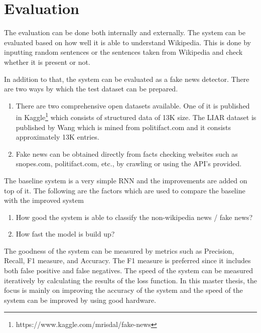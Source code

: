 \documentclass[a4paper, 11pt]{article}
\begin{document}
\section{Evaluation}

The evaluation can be done both internally and externally. The system can be evaluated based on how well it is able to understand Wikipedia. This is done by inputting random sentences or the sentences taken from Wikipedia and check whether it is present or not. 

In addition to that, the system can be evaluated as a fake news detector. There are two ways by which the test dataset can be prepared. 

\begin{enumerate}
\item There are two comprehensive open datasets available. One of it is published in Kaggle\footnote{https://www.kaggle.com/mrisdal/fake-news} which consists of structured data of 13K size. The LIAR dataset is published by Wang \cite{Wang2017} which is mined from politifact.com and it consists approximately 13K entries.
\item Fake news can be obtained directly from facts checking websites such as snopes.com, politifact.com, etc., by crawling or using the API's provided.
\end{enumerate}

The baseline system is a very simple RNN and the improvements are added on top of it. The following are the factors which are used to compare the baseline with the improved system
\begin{enumerate}
\item How good the system is able to classify the non-wikipedia news / fake news?
\item How fast the model is build up?
\end{enumerate}

The goodness of the system can be measured by metrics such as Precision, Recall, F1 measure, and Accuracy. The F1 measure is preferred since it includes both false positive and false negatives. The speed of the system can be measured iteratively by calculating the results of the loss function. In this master thesis, the focus is mainly on improving the accuracy of the system and the speed of the system can be improved by using good hardware.  

\newpage

\end{document}
